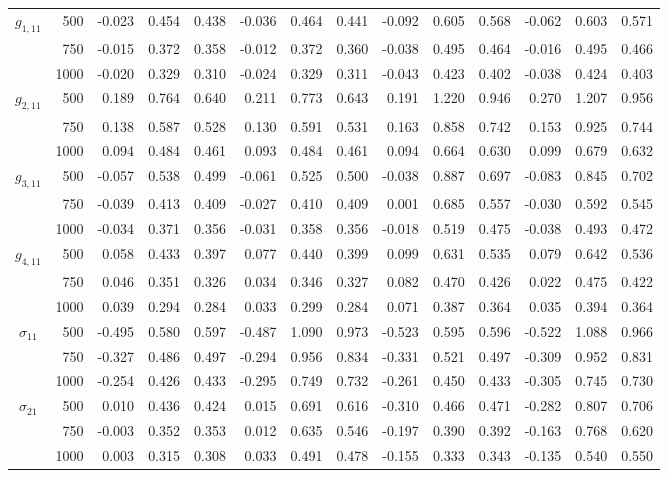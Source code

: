 \begin{table}[htbp]
\begin{adjustbox}{width=\textwidth}
\begin{tabular}{crrrrrrrrrrrrr}
$g_{1,11}$ & 500 & -0.023 & 0.454 & 0.438 & -0.036 & 0.464 & 0.441 & -0.092 & 0.605 & 0.568 & -0.062 & 0.603 & 0.571 \\
 & 750 & -0.015 & 0.372 & 0.358 & -0.012 & 0.372 & 0.360 & -0.038 & 0.495 & 0.464 & -0.016 & 0.495 & 0.466 \\
 & 1000 & -0.020 & 0.329 & 0.310 & -0.024 & 0.329 & 0.311 & -0.043 & 0.423 & 0.402 & -0.038 & 0.424 & 0.403 \\
$g_{2,11}$ & 500 & 0.189 & 0.764 & 0.640 & 0.211 & 0.773 & 0.643 & 0.191 & 1.220 & 0.946 & 0.270 & 1.207 & 0.956 \\
 & 750 & 0.138 & 0.587 & 0.528 & 0.130 & 0.591 & 0.531 & 0.163 & 0.858 & 0.742 & 0.153 & 0.925 & 0.744 \\
 & 1000 & 0.094 & 0.484 & 0.461 & 0.093 & 0.484 & 0.461 & 0.094 & 0.664 & 0.630 & 0.099 & 0.679 & 0.632 \\
$g_{3,11}$ & 500 & -0.057 & 0.538 & 0.499 & -0.061 & 0.525 & 0.500 & -0.038 & 0.887 & 0.697 & -0.083 & 0.845 & 0.702 \\
 & 750 & -0.039 & 0.413 & 0.409 & -0.027 & 0.410 & 0.409 & 0.001 & 0.685 & 0.557 & -0.030 & 0.592 & 0.545 \\
 & 1000 & -0.034 & 0.371 & 0.356 & -0.031 & 0.358 & 0.356 & -0.018 & 0.519 & 0.475 & -0.038 & 0.493 & 0.472 \\
$g_{4,11}$ & 500 & 0.058 & 0.433 & 0.397 & 0.077 & 0.440 & 0.399 & 0.099 & 0.631 & 0.535 & 0.079 & 0.642 & 0.536 \\
 & 750 & 0.046 & 0.351 & 0.326 & 0.034 & 0.346 & 0.327 & 0.082 & 0.470 & 0.426 & 0.022 & 0.475 & 0.422 \\
 & 1000 & 0.039 & 0.294 & 0.284 & 0.033 & 0.299 & 0.284 & 0.071 & 0.387 & 0.364 & 0.035 & 0.394 & 0.364 \\
$\sigma_{11}$ & 500 & -0.495 & 0.580 & 0.597 & -0.487 & 1.090 & 0.973 & -0.523 & 0.595 & 0.596 & -0.522 & 1.088 & 0.966 \\
 & 750 & -0.327 & 0.486 & 0.497 & -0.294 & 0.956 & 0.834 & -0.331 & 0.521 & 0.497 & -0.309 & 0.952 & 0.831 \\
 & 1000 & -0.254 & 0.426 & 0.433 & -0.295 & 0.749 & 0.732 & -0.261 & 0.450 & 0.433 & -0.305 & 0.745 & 0.730 \\
$\sigma_{21}$ & 500 & 0.010 & 0.436 & 0.424 & 0.015 & 0.691 & 0.616 & -0.310 & 0.466 & 0.471 & -0.282 & 0.807 & 0.706 \\
 & 750 & -0.003 & 0.352 & 0.353 & 0.012 & 0.635 & 0.546 & -0.197 & 0.390 & 0.392 & -0.163 & 0.768 & 0.620 \\
 & 1000 & 0.003 & 0.315 & 0.308 & 0.033 & 0.491 & 0.478 & -0.155 & 0.333 & 0.343 & -0.135 & 0.540 & 0.550 \\

\end{tabular}
\end{adjustbox}
\end{table}
